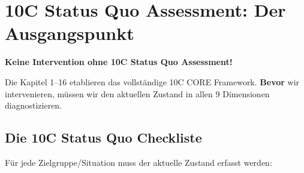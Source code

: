 
\section{10C Status Quo Assessment: Der Ausgangspunkt}
\label{sec:17-status-quo}

\begin{tcolorbox}[colback=blue!5!white, colframe=blue!75!black,
    title=\textbf{KRITISCH: Diagnose VOR Intervention}]
\textbf{Keine Intervention ohne 10C Status Quo Assessment!}

Die Kapitel 1--16 etablieren das vollständige 10C CORE Framework. \textbf{Bevor} wir intervenieren, müssen wir den aktuellen Zustand in allen 9 Dimensionen diagnostizieren.
\end{tcolorbox}

\subsection{Die 10C Status Quo Checkliste}

Für jede Zielgruppe/Situation muss der aktuelle Zustand erfasst werden:


